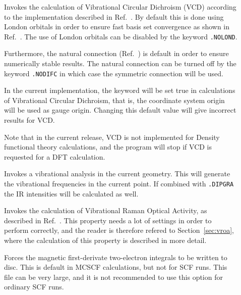 \begin{description}
\item[] Invokes the calculation of Vibrational Circular
Dichroism (VCD)
according to the implementation described in 
Ref.~\cite{klbpjthkrhjajjcp98}.  By default this is done using London
orbitals in order to 
ensure fast basis set convergence as shown in
Ref.~\cite{klbpjthkrhjajjcp100}. The use of London
orbitals can be disabled by the keyword \verb|.NOLOND|.

Furthermore, the natural connection
(Ref.~\cite{joklbkrthpjtca90,krthjopjklbcpl235}) is default in order to ensure
numerically stable results. The natural
connection can be turned off by the keyword \verb|.NODIFC| in which
case the symmetric connection will be used.


In the current implementation, the keyword  will be set
true in calculations of Vibrational Circular Dichroism, that is, the
coordinate system origin will be used as gauge origin. Changing this
default value will give incorrect results for VCD.

Note that in the current release, VCD is not implemented for Density
functional theory calculations, and the program will stop if VCD is
requested for a DFT calculation.


\item[] Invokes a vibrational analysis in the current
geometry. This will generate the vibrational frequencies in the
current point. If combined with \verb|.DIPGRA| the IR intensities
will be calculated as well. 

\item[] Invokes the calculation of Vibrational Raman
Optical Activity, as
described in Ref.~\cite{thkrklbpjjofd99}. This 
property needs a lot of settings in order to perform correctly, and
the reader is therefore refered to Section~\ref{sec:vroa}, where the
calculation of this property is described in more detail.

\item[] Forces the magnetic first-derivate two-electron
integrals to be written to disc. This is default in MCSCF
calculations, but not for SCF runs. This file can be very large, and
it is not recommended to use this option for ordinary SCF runs.

\end{description}

